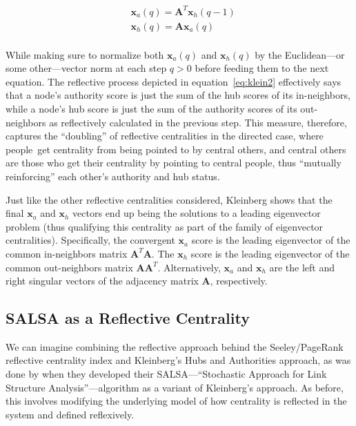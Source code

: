 \documentclass[a4paper,fleqn]{cas-sc}
\begin{document}
\begin{equation}
    \begin{split}
        &\mathbf{x}_a(q) = \mathbf{A}^T\mathbf{x}_h(q-1) \\
        &\mathbf{x}_h(q) = \mathbf{A}\mathbf{x}_a(q) \\
    \end{split}
    \label{eq:klein2}
\end{equation}

While making sure to normalize both $\mathbf{x}_a(q)$ and $\mathbf{x}_h(q)$ by the Euclidean---or some other---vector norm at each step $q > 0$ before feeding them to the next equation. The reflective process depicted in equation~\ref{eq:klein2} effectively says that a node's authority score is just the sum of the hub scores of its in-neighbors, while a node's hub score is just the sum of the authority scores of its out-neighbors as reflectively calculated in the previous step. This measure, therefore, captures the ``doubling'' of reflective centralities in the directed case, where people\ get centrality from being pointed to by central others, and central others are those who get their centrality by pointing to central people, thus ``mutually reinforcing'' \citep[136]{lempel_moran01} each other's authority and hub status. 

Just like the other reflective centralities considered, Kleinberg shows that the final $\mathbf{x}_a$ and $\mathbf{x}_h$ vectors end up being the solutions to a leading eigenvector problem (thus qualifying this centrality as part of the family of eigenvector centralities). Specifically, the convergent $\mathbf{x}_a$ score is the leading eigenvector of the common in-neighbors matrix $\mathbf{A}^T\mathbf{A}$. The $\mathbf{x}_h$ score is the leading eigenvector of the common out-neighbors matrix $\mathbf{A}\mathbf{A}^T$. Alternatively, $\mathbf{x}_a$ and $\mathbf{x}_h$ are the left and right singular vectors of the adjacency matrix $\mathbf{A}$, respectively.

\subsection{SALSA as a Reflective Centrality}
We can imagine combining the reflective approach behind the Seeley/PageRank reflective centrality index and Kleinberg's Hubs and Authorities approach, as was done by \citet{lempel_moran01} when they developed their SALSA---``Stochastic Approach for Link Structure Analysis''---algorithm as a variant of Kleinberg's approach. As before, this involves modifying the underlying model of how centrality is reflected in the system and defined reflexively. 
\end{document}

